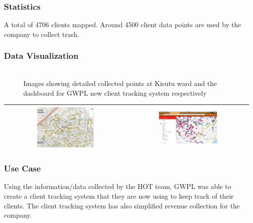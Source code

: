 \documentclass[a4paper,12pt,twoside]{article}
\begin{document}
\subsubsection{Statistics}
A total of 4706 clients mapped.
Around 4500 client data points are used by the company to collect trash.

\newpage
\subsubsection{Data Visualization}
\begin{figure}[h]
	\caption{Images showing detailed collected points at Kisutu ward and the dashboard for GWPL new client tracking system respectively}
	\centering
	\includegraphics[width=0\textwidth]{images/Building_Footprint_Digitization.png}
\end{figure}
\begin{tabular}{|c@{}c|}
	\hline
	
	\includegraphics[width=0.5\textwidth]{images/GWPL_client_map.png}&%
	\includegraphics[width=0.5\textwidth]{images/GWPL_client_tracking_system.png}\\
	\hline
\end{tabular}

\subsubsection{Use Case}
Using the information/data collected by the HOT team, GWPL was able to create a client tracking system that they are now using to keep track of their clients. The client tracking system has also simplified revenue collection for the company.
\end{document}
